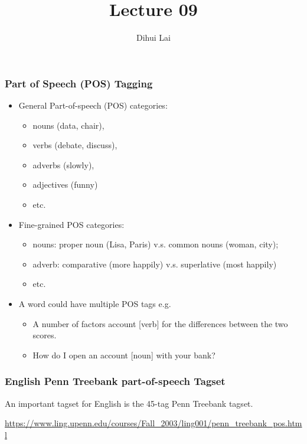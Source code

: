 \documentclass[notheorems, aspectratio=54]{beamer}
\title{Lecture 09}
\author{Dihui Lai}
\institute[WUSTL]{dlai@wustl.edu}
\begin{document}
\begin{frame}
    \titlepage
\end{frame}
\begin{frame}
\frametitle{Part of Speech (POS) Tagging}
\begin{itemize}
\item General Part-of-speech (POS) categories: 
\begin{itemize}
\item nouns (data, chair),
\item verbs (debate, discuss),
\item  adverbs (slowly), 
\item  adjectives (funny)
\item etc.
\end{itemize}
\item Fine-grained POS categories:
\begin{itemize}
\item nouns: proper noun (Lisa, Paris) v.s. common nouns (woman, city); 
\item adverb: comparative (more happily) v.s. superlative (most happily)
\item etc.
\end{itemize}
\item A word could have multiple POS tags e.g. 
\begin{itemize}
\item A number of factors account [verb] for the differences between the two scores.
\item How do I open an account [noun] with your bank?
\end{itemize}
\end{itemize}
\end{frame}

\begin{frame}

\frametitle{English Penn Treebank part-of-speech Tagset}

An important tagset for English is the 45-tag Penn Treebank tagset. 

\vspace{1cm}

\url{https://www.ling.upenn.edu/courses/Fall_2003/ling001/penn_treebank_pos.html}

\end{frame}
\end{document}
